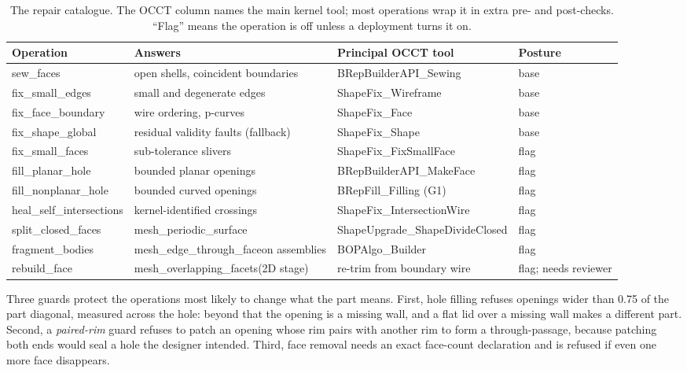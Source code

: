 \documentclass[11pt,onecolumn]{article}
\newcommand{\code}[1]{\texttt{\small #1}}
\newcommand{\tablecode}{\renewcommand{\code}[1]{{\fontsize{7.2}{8.6}\selectfont\ttfamily ##1}}}
\begin{document}
\begin{table}[t]
\centering
\caption{The repair catalogue. The OCCT column names the main kernel tool; most operations wrap it
in extra pre- and post-checks. ``Flag'' means the operation is off unless a deployment turns it on.}
\label{tab:ops}
\footnotesize\tablecode
\begin{tabularx}{\textwidth}{@{}L{34mm} L{33mm} X L{15mm}@{}}
\toprule
\textbf{Operation} & \textbf{Answers} & \textbf{Principal OCCT tool} & \textbf{Posture}\\
\midrule
\code{sew\_faces}              & open shells, coincident boundaries      & \code{BRepBuilderAPI\_Sewing} & base\\
\code{fix\_small\_edges}       & small and degenerate edges              & \code{ShapeFix\_Wireframe}         & base\\
\code{fix\_face\_boundary}     & wire ordering, p-curves                 & \code{ShapeFix\_Face}              & base\\
\code{fix\_shape\_global}      & residual validity faults (fallback)     & \code{ShapeFix\_Shape}             & base\\
\code{fix\_small\_faces}       & sub-tolerance slivers                   & \code{ShapeFix\_FixSmallFace}      & flag\\
\code{fill\_planar\_hole}      & bounded planar openings                 & \code{BRepBuilderAPI\_MakeFace} & flag\\
\code{fill\_nonplanar\_hole}   & bounded curved openings                 & \code{BRepFill\_Filling} (G1)      & flag\\
\code{heal\_self\_intersections}& kernel-identified crossings            & \code{ShapeFix\_IntersectionWire} & flag\\
\code{split\_closed\_faces} & \code{mesh\_periodic\_surface}          & \code{ShapeUpgrade\_Shape\-Divide\-Closed} & flag\\
\code{fragment\_bodies}        & \code{mesh\_edge\_through\_face}\newline on assemblies & \code{BOPAlgo\_Builder}      & flag\\
\code{rebuild\_face}           & \code{mesh\_overlapping\_facets}\newline(2D stage) & re-trim from boundary wire & flag; needs reviewer\\
\bottomrule
\end{tabularx}
\end{table}

Three guards protect the operations most likely to change what the part means. First, hole filling
refuses openings wider than 0.75 of the part diagonal, measured across the hole: beyond that the
opening is a missing wall, and a flat lid over a missing wall makes a different part. Second, a
\emph{paired-rim} guard refuses to patch an opening whose rim pairs with another rim to form a
through-passage, because patching both ends would seal a hole the designer intended. Third, face
removal needs an exact face-count declaration and is refused if even one more face disappears.
\end{document}
